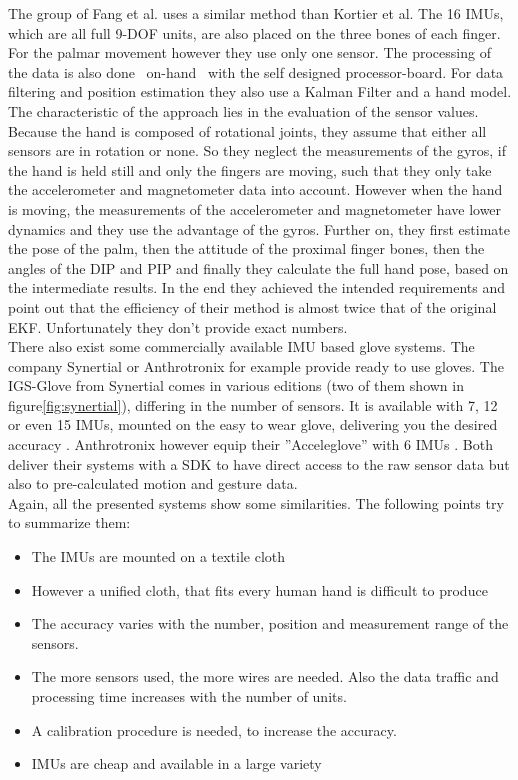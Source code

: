 The group of Fang et al. uses a similar method than Kortier et al. The 16 IMUs, which are all full 9-DOF units, are also placed on the three bones of each finger. For the palmar movement however they use only one sensor. The processing of the data is also done ~\grqq on-hand\grqq~ with the self designed processor-board. For data filtering and position estimation they also use a Kalman Filter and a hand model. The characteristic of the approach lies in the evaluation of the sensor values. Because the hand is composed of rotational joints, they assume that either all sensors are in rotation or none. So they neglect the measurements of the gyros, if the hand is held still and only the fingers are moving, such that they only take the accelerometer and magnetometer data into account. However when the hand is moving, the measurements of the accelerometer and magnetometer have lower dynamics and they use the advantage of the gyros. Further on, they first estimate the pose of the palm, then the attitude of the proximal finger bones, then the angles of the DIP and PIP and finally they calculate the full hand pose, based on the intermediate results. In the end they achieved the intended requirements and point out that the efficiency of their method is almost twice that of the original EKF. Unfortunately they don't provide exact numbers.\\
There also exist some commercially available IMU based glove systems. The company Synertial or Anthrotronix for example provide ready to use gloves. The IGS-Glove from Synertial comes in various editions (two of them shown in figure\ref{fig:synertial}), differing in the number of sensors. It is available with 7, 12 or even 15 IMUs, mounted on the easy to wear glove, delivering you the desired accuracy \cite{Synertial}. Anthrotronix however equip their ''Acceleglove'' with 6 IMUs \cite{anthrotronix}. Both deliver their systems with a SDK to have direct access to the raw sensor data but also to pre-calculated motion and gesture data.\\

Again, all the presented systems show some similarities. The following points try to summarize them:
\begin{itemize}
\item The IMUs are mounted on a textile cloth
\item However a unified cloth, that fits every human hand is difficult to produce
\item The accuracy varies with the number, position and measurement range of the sensors.
\item The more sensors used, the more wires are needed. Also the data traffic and processing time increases with the number of units.
\item A calibration procedure is needed, to increase the accuracy.
\item IMUs are cheap and available in a large variety
\end{itemize}

